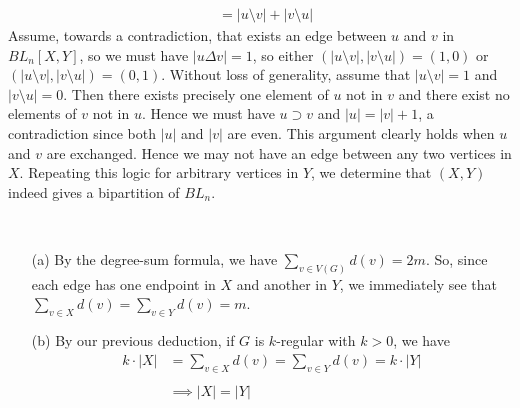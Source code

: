 \begin{ans}
\begin{itemize}
\begin{align*}
							  &= |u \setminus v| + |v \setminus u|
	\end{align*}
	Assume, towards a contradiction, that exists an edge between $u$ and $v$ in $BL_n[X,Y]$, so we must have $|u \Delta v| = 1$, so either $(|u \setminus v|,|v \setminus u|) = (1,0)$ or $(|u \setminus v|,|v \setminus u|) = (0,1)$. Without loss of generality, assume that $|u \setminus v| = 1$ and $|v \setminus u| = 0$. Then there exists precisely one element of $u$ not in $v$ and there exist no elements of $v$ not in $u$. Hence we must have $u \supset v$ and $|u| = |v|+1$, a contradiction since both $|u|$ and $|v|$ are even. This argument clearly holds when $u$ and $v$ are exchanged. Hence we may not have an edge between any two vertices in $X$. Repeating this logic for arbitrary vertices in $Y$, we determine that $(X,Y)$ indeed gives a bipartition of $BL_n$.
\end{itemize}
\end{ans}

\begin{ans} \
\begin{itemize}
	\item[(a)] By the degree-sum formula, we have $\sum_{v \in V(G)} {d(v)} = 2m$. So, since each edge has one endpoint in $X$ and another in $Y$, we immediately see that $\sum_{v \in X} {d(v)} = \sum_{v \in Y} {d(v)} = m$.
	\item[(b)] By our previous deduction, if $G$ is $k$-regular with $k>0$, we have
	\begin{align*}
	k \cdot |X| &= \sum_{v \in X} {d(v)} 
				= \sum_{v \in Y} {d(v)} 
				= k \cdot |Y| \\
	\\
	&\implies |X| = |Y|
	\end{align*}
\end{itemize}
\end{ans}
